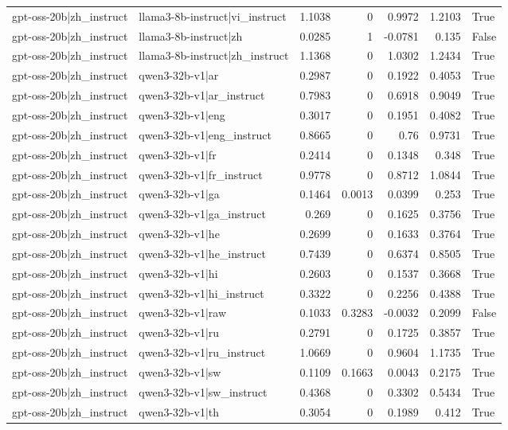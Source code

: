 \begin{table}
\begin{tabular}{l l r r r r l}
gpt-oss-20b|zh_instruct & llama3-8b-instruct|vi_instruct & 1.1038 & 0 & 0.9972 & 1.2103 & True \\
gpt-oss-20b|zh_instruct & llama3-8b-instruct|zh & 0.0285 & 1 & -0.0781 & 0.135 & False \\
gpt-oss-20b|zh_instruct & llama3-8b-instruct|zh_instruct & 1.1368 & 0 & 1.0302 & 1.2434 & True \\
gpt-oss-20b|zh_instruct & qwen3-32b-v1|ar & 0.2987 & 0 & 0.1922 & 0.4053 & True \\
gpt-oss-20b|zh_instruct & qwen3-32b-v1|ar_instruct & 0.7983 & 0 & 0.6918 & 0.9049 & True \\
gpt-oss-20b|zh_instruct & qwen3-32b-v1|eng & 0.3017 & 0 & 0.1951 & 0.4082 & True \\
gpt-oss-20b|zh_instruct & qwen3-32b-v1|eng_instruct & 0.8665 & 0 & 0.76 & 0.9731 & True \\
gpt-oss-20b|zh_instruct & qwen3-32b-v1|fr & 0.2414 & 0 & 0.1348 & 0.348 & True \\
gpt-oss-20b|zh_instruct & qwen3-32b-v1|fr_instruct & 0.9778 & 0 & 0.8712 & 1.0844 & True \\
gpt-oss-20b|zh_instruct & qwen3-32b-v1|ga & 0.1464 & 0.0013 & 0.0399 & 0.253 & True \\
gpt-oss-20b|zh_instruct & qwen3-32b-v1|ga_instruct & 0.269 & 0 & 0.1625 & 0.3756 & True \\
gpt-oss-20b|zh_instruct & qwen3-32b-v1|he & 0.2699 & 0 & 0.1633 & 0.3764 & True \\
gpt-oss-20b|zh_instruct & qwen3-32b-v1|he_instruct & 0.7439 & 0 & 0.6374 & 0.8505 & True \\
gpt-oss-20b|zh_instruct & qwen3-32b-v1|hi & 0.2603 & 0 & 0.1537 & 0.3668 & True \\
gpt-oss-20b|zh_instruct & qwen3-32b-v1|hi_instruct & 0.3322 & 0 & 0.2256 & 0.4388 & True \\
gpt-oss-20b|zh_instruct & qwen3-32b-v1|raw & 0.1033 & 0.3283 & -0.0032 & 0.2099 & False \\
gpt-oss-20b|zh_instruct & qwen3-32b-v1|ru & 0.2791 & 0 & 0.1725 & 0.3857 & True \\
gpt-oss-20b|zh_instruct & qwen3-32b-v1|ru_instruct & 1.0669 & 0 & 0.9604 & 1.1735 & True \\
gpt-oss-20b|zh_instruct & qwen3-32b-v1|sw & 0.1109 & 0.1663 & 0.0043 & 0.2175 & True \\
gpt-oss-20b|zh_instruct & qwen3-32b-v1|sw_instruct & 0.4368 & 0 & 0.3302 & 0.5434 & True \\
gpt-oss-20b|zh_instruct & qwen3-32b-v1|th & 0.3054 & 0 & 0.1989 & 0.412 & True \\

\end{tabular}
\end{table}
